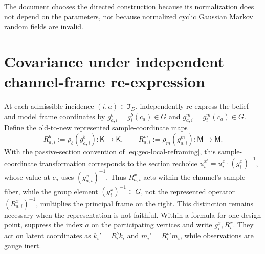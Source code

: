 The document chooses the directed construction because its normalization does not depend on the
parameters, not because normalized cyclic Gaussian Markov random fields are invalid.

\section{Covariance under independent channel-frame re-expression}
\label{sec:gen-gauge}

At each admissible incidence $(i,a)\in\mathfrak I_D$, independently re-express the belief and
model frame coordinates by
$g_{a,i}^b=g_i^b(c_a)\in G$ and $g_{a,i}^m=g_i^m(c_a)\in G$.  Define the
old-to-new represented sample-coordinate maps
\begin{equation}
R_{a,i}^b:=\rho_b(g_{a,i}^b):\mathsf K\longrightarrow\mathsf K,
\qquad
R_{a,i}^m:=\rho_m(g_{a,i}^m):\mathsf M\longrightarrow\mathsf M.
\label{eq:gen-rep-actions}
\end{equation}
With the passive-section convention of
\eqref{eq:geo-local-reframing}, this sample-coordinate transformation
corresponds to the section rechoice
$u_i^{x\prime}=u_i^x\cdot(g_i^x)^{-1}$, whose value at $c_a$ uses
$(g_{a,i}^x)^{-1}$.  Thus $R_{a,i}^x$ acts within the
channel's sample fiber, while the group element $(g_i^x)^{-1}\in G$, not the
represented operator $(R_{a,i}^x)^{-1}$, multiplies the principal frame on the right.  This
distinction remains necessary when the representation is not faithful.
Within a formula for one design point, suppress the index $a$ on the participating vertices and write $g_i^x,R_i^x$.
They act on latent coordinates as $k_i'=R_i^bk_i$ and $m_i'=R_i^mm_i$, while observations are
gauge inert. 

